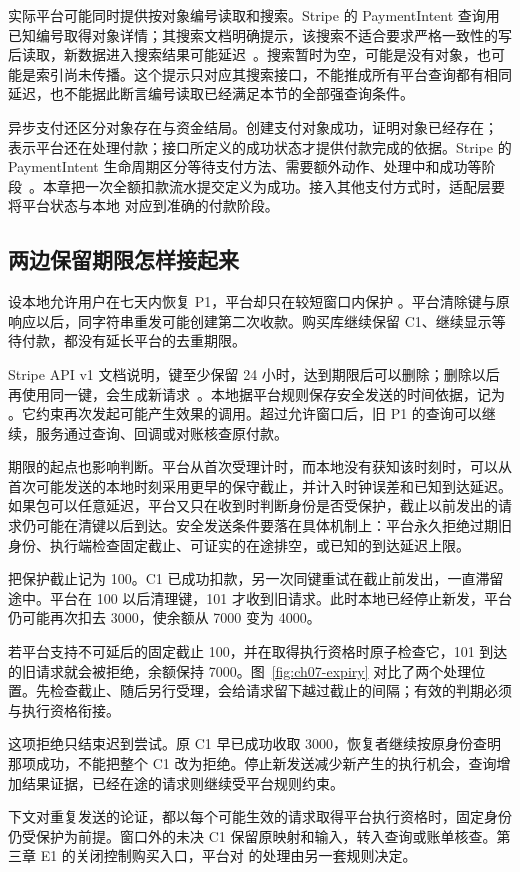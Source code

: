实际平台可能同时提供按对象编号读取和搜索。Stripe 的 PaymentIntent 查询用已知编号取得对象详情；其搜索文档明确提示，该搜索不适合要求严格一致性的写后读取，新数据进入搜索结果可能延迟~\cite{stripe-payment-intents}。搜索暂时为空，可能是没有对象，也可能是索引尚未传播。这个提示只对应其搜索接口，不能推成所有平台查询都有相同延迟，也不能据此断言编号读取已经满足本节的全部强查询条件。

异步支付还区分对象存在与资金结局。创建支付对象成功，证明对象已经存在； 表示平台还在处理付款；接口所定义的成功状态才提供付款完成的依据。Stripe 的 PaymentIntent 生命周期区分等待支付方法、需要额外动作、处理中和成功等阶段~\cite{stripe-payment-intents}。本章把一次全额扣款流水提交定义为成功。接入其他支付方式时，适配层要将平台状态与本地  对应到准确的付款阶段。

\subsection*{两边保留期限怎样接起来}

设本地允许用户在七天内恢复 P1，平台却只在较短窗口内保护 。平台清除键与原响应以后，同字符串重发可能创建第二次收款。购买库继续保留 C1、继续显示等待付款，都没有延长平台的去重期限。

Stripe API v1 文档说明，键至少保留 24 小时，达到期限后可以删除；删除以后再使用同一键，会生成新请求~\cite{stripe-v1-idempotency}。本地据平台规则保存安全发送的时间依据，记为 。它约束再次发起可能产生效果的调用。超过允许窗口后，旧 P1 的查询可以继续，服务通过查询、回调或对账核查原付款。


期限的起点也影响判断。平台从首次受理计时，而本地没有获知该时刻时，可以从首次可能发送的本地时刻采用更早的保守截止，并计入时钟误差和已知到达延迟。如果包可以任意延迟，平台又只在收到时判断身份是否受保护，截止以前发出的请求仍可能在清键以后到达。安全发送条件要落在具体机制上：平台永久拒绝过期旧身份、执行端检查固定截止、可证实的在途排空，或已知的到达延迟上限。

把保护截止记为 100。C1 已成功扣款，另一次同键重试在截止前发出，一直滞留途中。平台在 100 以后清理键，101 才收到旧请求。此时本地已经停止新发，平台仍可能再次扣去 3000，使余额从 7000 变为 4000。

若平台支持不可延后的固定截止 100，并在取得执行资格时原子检查它，101 到达的旧请求就会被拒绝，余额保持 7000。图~\ref{fig:ch07-expiry} 对比了两个处理位置。先检查截止、随后另行受理，会给请求留下越过截止的间隔；有效的判期必须与执行资格衔接。


这项拒绝只结束迟到尝试。原 C1 早已成功收取 3000，恢复者继续按原身份查明那项成功，不能把整个 C1 改为拒绝。停止新发送减少新产生的执行机会，查询增加结果证据，已经在途的请求则继续受平台规则约束。

下文对重复发送的论证，都以每个可能生效的请求取得平台执行资格时，固定身份仍受保护为前提。窗口外的未决 C1 保留原映射和输入，转入查询或账单核查。第三章 E1 的关闭控制购买入口，平台对  的处理由另一套规则决定。

